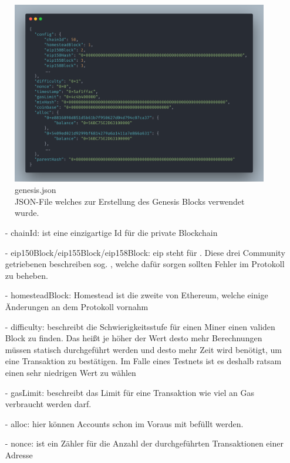 \begin{figure}[th!]
	\centering
	\includegraphics[width=.9\columnwidth]{./Abbildungen/Kapitel_03/genesis.json.png}
	\caption{
		genesis.json\\
		JSON-File welches zur Erstellung des Genesis Blocks verwendet wurde.
	}
	\label{img:gen}
\end{figure}

\begin{itemize}
	\item[-] chainId: ist eine einzigartige Id für die private Blockchain
	      	      	      	      
	\item[-] eip150Block/eip155Block/eip158Block: eip steht für . Diese drei Community getriebenen  beschreiben sog. , welche dafür sorgen sollten Fehler im Protokoll zu beheben. 
	      	      	      	      
	\item[-] homesteadBlock: Homestead ist die zweite  von Ethereum, welche einige Änderungen an dem Protokoll vornahm
	      	      	      	      	
	\item[-] difficulty: beschreibt die Schwierigkeitsstufe für einen Miner einen validen Block zu finden. Das heißt je höher der Wert desto mehr Berechnungen müssen statisch durchgeführt werden und desto mehr Zeit wird benötigt, um eine Transaktion zu bestätigen. Im Falle eines Testnets ist es deshalb ratsam einen sehr niedrigen Wert zu wählen
	      	      	      	      	
	\item[-] gasLimit: beschreibt das Limit für eine Transaktion wie viel an Gas verbraucht werden darf. 
	      	      	      	      
	\item[-] alloc: hier können Accounts schon im Voraus mit  befüllt werden.
	\item[-] nonce: ist ein Zähler für die Anzahl der durchgeführten Transaktionen einer Adresse
\end{itemize}

